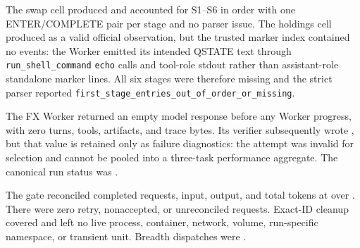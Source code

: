 
 The swap cell produced
\SsixCoreVtwoGateSwapOfficial{} and accounted for S1--S6 in order with one
ENTER/COMPLETE pair per stage and no parser issue. The holdings cell produced
\SsixCoreVtwoGateHoldingsOfficial{} as a valid official observation, but the
trusted marker index contained no events: the Worker emitted its intended
QSTATE text through \texttt{run\_shell\_command} \texttt{echo} calls and
tool-role stdout rather than assistant-role standalone marker lines. All six
stages were therefore missing and the strict parser reported
\texttt{first\_stage\_entries\_out\_of\_order\_or\_missing}.

The FX Worker returned an empty model response before any Worker progress,
with zero turns, tools, artifacts, and trace bytes. Its verifier subsequently
wrote \SsixCoreVtwoGateFxRecord{}, but that value is retained only as failure
diagnostics: the attempt was invalid for selection and cannot be pooled into a
three-task performance aggregate. The canonical run status was
\SsixCoreVtwoGateRunStatus{}.

The gate reconciled \SsixCoreVtwoGateRequests{} completed requests,
\SsixCoreVtwoGateInputTokens{} input, \SsixCoreVtwoGateOutputTokens{} output,
and \SsixCoreVtwoGateTokens{} total tokens at
\SsixCoreVtwoGateCost{} over \SsixCoreVtwoGateWall{}. There were zero retry,
nonaccepted, or unreconciled requests. Exact-ID cleanup covered
\SsixCoreVtwoGateCleanup{} and left no live process, container, network,
volume, run-specific namespace, or transient unit. Breadth dispatches were
\SsixCoreVtwoGateBreadthDispatches{}.


